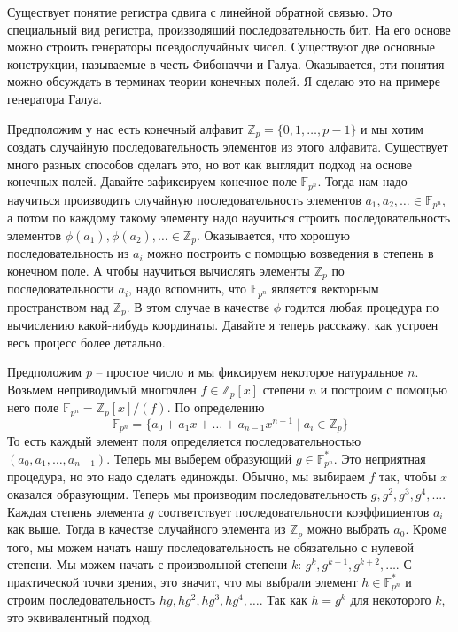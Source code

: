 Существует понятие регистра сдвига с линейной обратной связью.
Это специальный вид регистра, производящий последовательность бит.
На его основе можно строить генераторы псевдослучайных чисел.
Существуют две основные конструкции, называемые в честь Фибоначчи и Галуа.
Оказывается, эти понятия можно обсуждать в терминах теории конечных полей.
Я сделаю это на примере генератора Галуа.

Предположим у нас есть конечный алфавит $\mathbb Z_p = \{0,1,\ldots,p-1\}$ и мы хотим создать случайную последовательность элементов из этого алфавита.
Существует много разных способов сделать это, но вот как выглядит подход на основе конечных полей.
Давайте зафиксируем конечное поле $\mathbb F_{p^n}$.
Тогда нам надо научиться производить случайную последовательность элементов $a_1,a_2,\ldots\in \mathbb F_{p^n}$, а потом по каждому такому элементу надо научиться строить последовательность элементов $\phi(a_1),\phi(a_2),\ldots\in \mathbb Z_p$.
Оказывается, что хорошую последовательность из $a_i$ можно построить с помощью возведения в степень в конечном поле.
А чтобы научиться вычислять элементы $\mathbb Z_p$ по последовательности $a_i$, надо вспомнить, что $\mathbb F_{p^n}$ является векторным пространством над $\mathbb Z_p$.
В этом случае в качестве $\phi$ годится любая процедура по вычислению какой-нибудь координаты.
Давайте я теперь расскажу, как устроен весь процесс более детально.

Предположим $p$ -- простое число и мы фиксируем некоторое натуральное $n$.
Возьмем неприводимый многочлен $f\in \mathbb Z_p[x]$ степени $n$ и построим с помощью него поле $\mathbb F_{p^n} = \mathbb Z_p[x]/(f)$.
По определению
\[
\mathbb F_{p^n} = \{a_0 + a_1 x + \ldots + a_{n-1}x^{n-1}\mid a_i\in \mathbb Z_p\}
\]
То есть каждый элемент поля определяется последовательностью $(a_0, a_1,\ldots,a_{n-1})$.
Теперь мы выберем образующий $g\in \mathbb F_{p^n}^*$.
Это неприятная процедура, но это надо сделать единожды.
Обычно, мы выбираем $f$ так, чтобы $x$ оказался образующим.
Теперь мы производим последовательность $g, g^2, g^3, g^4,\ldots$.
Каждая степень элемента $g$ соответствует последовательности коэффициентов $a_i$ как выше.
Тогда в качестве случайного элемента из $\mathbb Z_p$ можно выбрать $a_0$.
Кроме того, мы можем начать нашу последовательность не обязательно с нулевой степени.
Мы можем начать с произвольной степени $k$: $g^k, g^{k+1}, g^{k+2}, \ldots$.
С практической точки зрения, это значит, что мы выбрали элемент $h\in \mathbb F_{p^n}^*$ и строим последовательность $hg, hg^2, hg^3, hg^4,\ldots$.
Так как $h = g^k$ для некоторого $k$, это эквивалентный подход.

